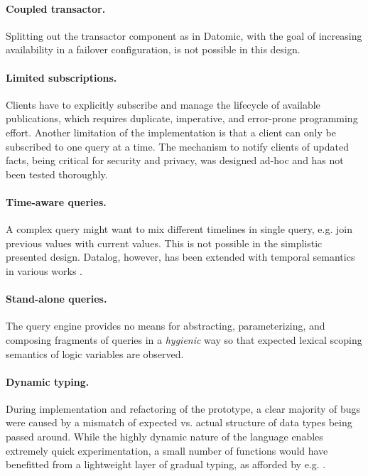 \paragraph{Coupled transactor.} Splitting out the transactor component as in Datomic, with the goal of increasing availability in a failover configuration, is not possible in this design.

\paragraph{Limited subscriptions.} Clients have to explicitly subscribe and manage the lifecycle of available publications, which requires duplicate, imperative, and error-prone programming effort. Another limitation of the implementation is that a client can only be subscribed to one query at a time. The mechanism to notify clients of updated facts, being critical for security and privacy, was designed ad-hoc and has not been tested thoroughly.

\paragraph{Time-aware queries.} A complex query might want to mix different timelines in single query, e.g. join previous values with current values. This is not possible in the simplistic presented design. Datalog, however, has been extended with temporal semantics in various works \cite{alvaro2010dedalus, aref2015design}.

\paragraph{Stand-alone queries.} The query engine provides no means for abstracting, parameterizing, and composing fragments of queries in a \emph{hygienic} way so that expected lexical scoping semantics of logic variables are observed.

\paragraph{Dynamic typing.} During implementation and refactoring of the prototype, a clear majority of bugs were caused by a mismatch of expected vs. actual structure of data types being passed around. While the highly dynamic nature of the language enables extremely quick experimentation, a small number of functions would have benefitted from a lightweight layer of gradual typing, as afforded by e.g.  \cite{pinzaru2019towards}.


